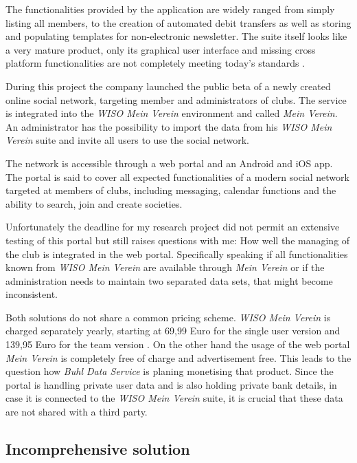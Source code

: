 The functionalities provided by the application are widely ranged from simply listing all members, to the creation of automated debit transfers as well as storing and populating templates for non-electronic newsletter. The suite itself looks like a very mature product, only its graphical user interface and missing cross platform functionalities are not completely meeting today's standards \cite{Buhl:2015ab}. 

During this project the company launched the public beta of a newly created online social network, targeting member and administrators of clubs. The service is integrated into the \emph{WISO Mein Verein} environment and called \emph{Mein Verein}. An administrator has the possibility to import the data from his \emph{WISO Mein Verein} suite and invite all users to use the social network. 

The network is accessible through a web portal and an Android and iOS app. The portal is said to cover all expected functionalities of a modern social network targeted at members of clubs, including messaging, calendar functions and the ability to search, join and create societies. 

Unfortunately the deadline for my research project did not permit an extensive testing of this portal but still raises questions with me: How well the managing of the club is integrated in the web portal. Specifically speaking if all functionalities known from \emph{WISO Mein Verein} are available through \emph{Mein Verein} or if the administration needs to maintain two separated data sets, that might become inconsistent. 

Both solutions do not share a common pricing scheme. \emph{WISO Mein Verein} is charged separately yearly, starting at 69,99 Euro for the single user version and 139,95 Euro for the team version \cite{Buhl:2015ab}. On the other hand the usage of the web portal \emph{Mein Verein} is completely free of charge and advertisement free. This leads to the question how \emph{Buhl Data Service} is planing monetising that product. Since the portal is handling private user data and is also holding private bank details, in case it is connected to the \emph{WISO Mein Verein} suite, it is crucial that these data are not shared with a third party.

\subsection{Incomprehensive solution}

